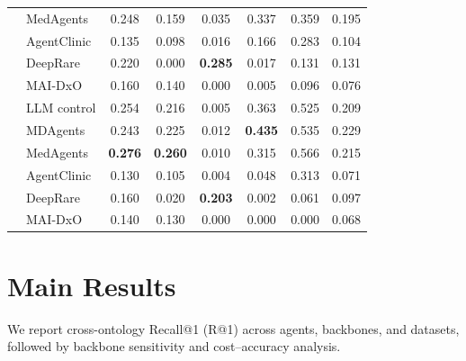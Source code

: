 \begin{table}[hpbt]
\begin{tabular}{@{}llcccccc@{}}
 & MedAgents & 0.248 & 0.159 & 0.035 & 0.337 & 0.359 & 0.195 \\
 & AgentClinic & 0.135 & 0.098 & 0.016 & 0.166 & 0.283 & 0.104 \\
 & DeepRare & 0.220 & 0.000 & \textbf{0.285} & 0.017 & 0.131 & 0.131 \\
 & MAI-DxO & 0.160 & 0.140 & 0.000 & 0.005 & 0.096 & 0.076 \\
\midrule
{} & LLM control & 0.254 & 0.216 & 0.005 & 0.363 & 0.525 & 0.209 \\
 & MDAgents & 0.243 & 0.225 & 0.012 & \textbf{0.435} & 0.535 & 0.229 \\
 & MedAgents & \textbf{0.276} & \textbf{0.260} & 0.010 & 0.315 & 0.566 & 0.215 \\
 & AgentClinic & 0.130 & 0.105 & 0.004 & 0.048 & 0.313 & 0.071 \\
 & DeepRare & 0.160 & 0.020 & \textbf{0.203} & 0.002 & 0.061 & 0.097 \\
 & MAI-DxO & 0.140 & 0.130 & 0.000 & 0.000 & 0.000 & 0.068 \\
\bottomrule
\end{tabular}
\end{table}

\section{Main Results}
\label{sec-6}

We report cross-ontology Recall@1 (R@1) across agents, backbones, and datasets, followed by backbone sensitivity and cost--accuracy analysis.

